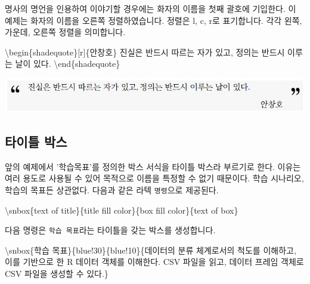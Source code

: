\documentclass[
  letterpaper,
]{book}
\newenvironment{Shaded}{\begin{snugshade}}{\end{snugshade}}
\newcommand{\ExtensionTok}[1]{\textcolor[rgb]{0.00,0.23,0.31}{#1}}
\newcommand{\FunctionTok}[1]{\textcolor[rgb]{0.28,0.35,0.67}{#1}}
\newcommand{\KeywordTok}[1]{\textcolor[rgb]{0.00,0.23,0.31}{#1}}
\newcommand{\NormalTok}[1]{\textcolor[rgb]{0.00,0.23,0.31}{#1}}
\begin{document}
명사의 명언을 인용하여 이야기할 경우에는 화자의 이름을 첫째 괄호에
기입한다. 이 예제는 화자의 이름을 오른쪽 정렬하였습니다. 정렬은 l, c,
r로 표기합니다. 각각 왼쪽, 가운데, 오른쪽 정렬을 의미합니다.

\begin{Shaded}
\begin{Highlighting}[]
\KeywordTok{\textbackslash{}begin}\NormalTok{\{}\ExtensionTok{shadequote}\NormalTok{\}[r]\{안창호\}}
\NormalTok{진실은 반드시 따르는 자가 있고, 정의는 반드시 이루는 날이 있다.}
\KeywordTok{\textbackslash{}end}\NormalTok{\{}\ExtensionTok{shadequote}\NormalTok{\}}
\end{Highlighting}
\end{Shaded}

\includegraphics{images/quote_ahn.jpg}

\hypertarget{uxd0c0uxc774uxd2c0-uxbc15uxc2a4}{%
\subsection{타이틀 박스}\label{uxd0c0uxc774uxd2c0-uxbc15uxc2a4}}

앞의 예제에서 '학습목표'를 정의한 박스 서식을 타이틀 박스라 부르기로
한다. 이유는 여러 용도로 사용될 수 있어 목적으로 이름을 특정할 수 없기
때문이다. 학습 시나리오, 학습의 목표든 상관없다. 다음과 같은 라텍
\texttt{명령}으로 제공된다.

\begin{Shaded}
\begin{Highlighting}[]
\FunctionTok{\textbackslash{}snbox}\NormalTok{\{text of title\}\{title fill color\}\{box fill color\}\{text of box\} }
\end{Highlighting}
\end{Shaded}

다음 명령은 \texttt{학습\ 목표}라는 타이틀을 갖는 박스를 생성합니다.

\begin{Shaded}
\begin{Highlighting}[]
\FunctionTok{\textbackslash{}snbox}\NormalTok{\{학습 목표\}\{blue!30\}\{blue!10\}\{데이터의 분류 체계로서의 척도를 이해하고, }
\NormalTok{이를 기반으로 한 R 데이터 객체를 이해한다. CSV 파일을 읽고, 데이터 프레임 }
\NormalTok{객체로 CSV 파일을 생성할 수 있다.\}}
\end{Highlighting}
\end{Shaded}
\end{document}
